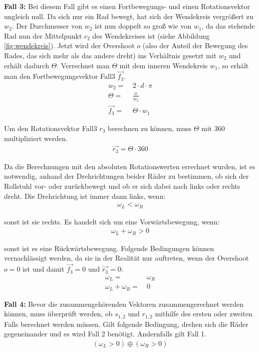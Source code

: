\textbf{Fall 3:}
Bei diesem Fall gibt es einen Fortbewegungs- und einen Rotationsvektor ungleich null.
Da sich nur ein Rad bewegt, hat sich der Wendekreis vergrößert zu $w_2$.
Der Durchmesser von $w_2$ ist nun doppelt so groß wie von $w_1$, da das stehende Rad nun der Mittelpunkt $c_2$ des Wendekreises ist (siehe Abbildung \ref{fig:wendekreis}).
Jetzt wird der Overshoot $o$ (also der Anteil der Bewegung des Rades, das sich mehr als das andere dreht) ins Verhältnis gesetzt mit $w_2$ und erhält dadurch $\Theta$.
Verrechnet man $\Theta$ mit dem inneren Wendekreis $w_1$, so erhält man den Fortbewegungsvektor Fall3 $\vec{f_3}$.
\begin{align}
    w_2 =       & \ 2 \cdot d \cdot \pi \\
    \Theta =    & \ \frac {o} {w_2}     \\
    \vec{f_3} = & \ \Theta \cdot w_1
\end{align}

Um den Rotationsvektor Fall3 $r_3$ berechnen zu können, muss $\Theta$ mit $360$ multipliziert werden.
\begin{align}
    \vec{r_3} = \Theta \cdot 360
\end{align}

Da die Berechnungen mit den absoluten Rotationswerten errechnet wurden, ist es notwendig, anhand der Drehrichtungen beider Räder zu bestimmen, ob sich der Rollstuhl vor- oder zurückbewegt und ob er sich dabei nach links oder rechts dreht.
Die Drehrichtung ist immer dann links, wenn:
\begin{align}
    \omega_L < \omega_R
\end{align}

sonst ist sie rechts.
Es handelt sich um eine Vorwärtsbewegung, wenn:
\begin{align}
    \omega_L + \omega_R > 0
\end{align}

sonst ist es eine Rückwärtsbewegung.
Folgende Bedingungen können vernachlässigt werden, da sie in der Realität nur auftreten, wenn der Overshoot $o = 0$ ist und damit $\vec{f_3} = 0$ und $\vec{r_3} = 0$:
\begin{align}
    \omega_L =            & \ \omega_R \\
    \omega_L + \omega_R = & \ 0
\end{align}

\textbf{Fall 4:}
Bevor die zusammengehörenden Vektoren zusammengerechnet werden können, muss überprüft werden, ob $s_{1,2}$ und $r_{1,2}$ mithilfe des ersten oder zweiten Falls berechnet werden müssen.
Gilt folgende Bedingung, drehen sich die Räder gegeneinander und es wird Fall 2 benötigt.
Andernfalls gilt Fall 1.
\begin{align}
    (\omega_L > 0) \oplus (\omega_R > 0)
\end{align}

